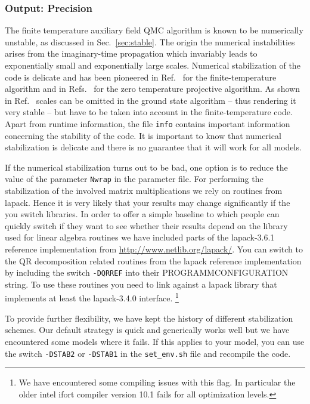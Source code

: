 \subsubsection{Output: Precision} \label{sec:output_prec}
%
The finite temperature  auxiliary field QMC algorithm is known to be numerically  unstable, as discussed in Sec.~\ref{sec:stable}.
The origin the numerical instabilities arises  from the imaginary-time propagation which invariably leads to exponentially small and exponentially large scales.
Numerical stabilization of the code is delicate and has been pioneered in Ref.~\cite{White89}  for the finite-temperature algorithm and in Refs.~\cite{Sugiyama86,Sorella89} for the zero temperature projective algorithm.
As shown in Ref.~\cite{Assaad08_rev}  scales can be omitted in the ground state algorithm -- thus rendering it very stable --  but have to be taken into account in the  finite-temperature code. Apart from runtime information, the file \texttt{info} contains important information concerning the stability of the code.
It is important to know that numerical stabilization is delicate and there is no guarantee  that it will work for all models.




If the numerical stabilization turns out to be bad, one option is to reduce the  value of the parameter \texttt{Nwrap} in the parameter file. 
For performing the stabilization of the involved matrix multiplications we rely on routines from lapack. Hence it is very likely that your results may change significantly if the you switch libraries.
In order to offer a simple baseline to which people can quickly switch if they want to see whether their results depend on the library used for linear algebra routines we have included parts of the lapack-3.6.1 reference implementation from
\url{http://www.netlib.org/lapack/}. You can switch to the QR decomposition related routines from the lapack reference implementation by including the switch \texttt{-DQRREF} into their PROGRAMMCONFIGURATION string.
To use these routines you need to link against a lapack library that implements at least the lapack-3.4.0 interface. \footnote{ We have encountered some compiling issues with this flag. In particular  the  older  intel  ifort  compiler version 10.1  fails for all optimization levels.} 

To provide further flexibility, we have  kept the history of different stabilization schemes.   Our default strategy is quick and generically works well but we have  encountered some  models where  it  fails.   If this applies to your model, you can use the switch \texttt{-DSTAB2}   or  \texttt{-DSTAB1}  in the \texttt{set\_env.sh}  file and recompile the code.  

